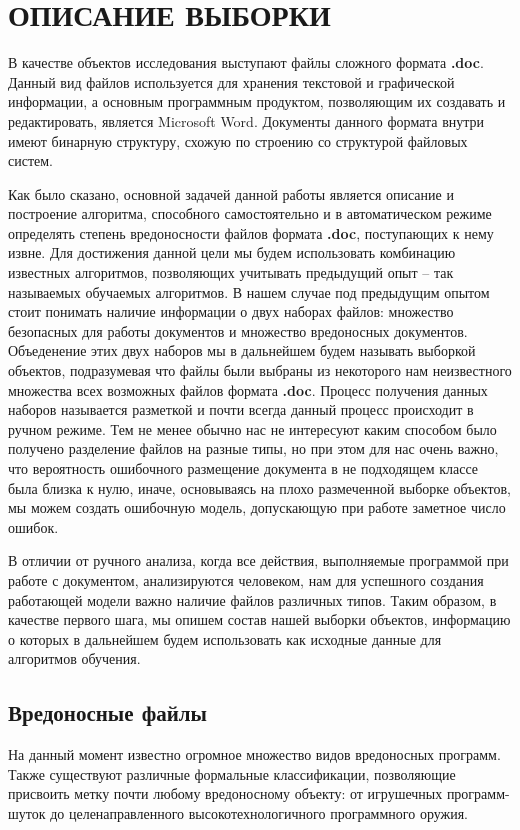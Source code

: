 \chapter{ОПИСАНИЕ ВЫБОРКИ}

В качестве объектов исследования выступают файлы сложного формата \textbf{.doc}.
Данный вид файлов используется для хранения текстовой и графической информации, а основным программным продуктом, позволяющим их создавать и редактировать, является Microsoft Word.
Документы данного формата внутри имеют бинарную структуру, схожую по строению со структурой файловых систем. \cite{doc_format}

Как было сказано, основной задачей данной работы является описание и построение алгоритма, способного самостоятельно и в автоматическом режиме определять степень вредоносности файлов формата \textbf{.doc}, поступающих к нему извне.
Для достижения данной цели мы будем использовать комбинацию известных алгоритмов, позволяющих учитывать предыдущий опыт -- так называемых обучаемых алгоритмов.
В нашем случае под предыдущим опытом стоит понимать наличие информации о двух наборах файлов: множество безопасных для работы документов и множество вредоносных документов.
Объеденение этих двух наборов мы в дальнейшем будем называть выборкой объектов, подразумевая что файлы были выбраны из некоторого нам неизвестного множества всех возможных файлов формата \textbf{.doc}. 
Процесс получения данных наборов называется разметкой и почти всегда данный процесс происходит в ручном режиме.
Тем не менее обычно нас не интересуют каким способом было получено разделение файлов на разные типы, но при этом для нас очень важно, что вероятность ошибочного размещение документа в не подходящем классе была близка к нулю, иначе, основываясь на плохо размеченной выборке объектов, мы можем создать ошибочную модель, допускающую при работе заметное число ошибок.

В отличии от ручного анализа, когда все действия, выполняемые программой при работе с документом, анализируются человеком, нам для успешного создания работающей модели важно наличие файлов различных типов.
Таким образом, в качестве первого шага, мы опишем состав нашей выборки объектов, информацию о которых в дальнейшем будем использовать как исходные данные для алгоритмов обучения.

\section{Вредоносные файлы}

На данный момент известно огромное множество видов вредоносных программ.
Также существуют различные формальные классификации, позволяющие присвоить метку почти любому вредоносному объекту: от игрушечных программ-шуток до целенаправленного высокотехнологичного программного оружия.

